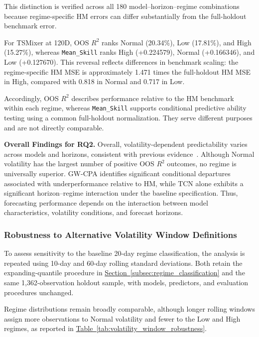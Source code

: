 \documentclass[runningheads,orivec]{llncs}
\begin{document}
This distinction is verified across all 180 model--horizon--regime combinations because regime-specific HM errors can differ substantially from the full-holdout benchmark error.

For TSMixer at 120D, OOS $R^2$ ranks Normal (20.34\%), Low (17.81\%), and High (15.27\%), whereas \texttt{Mean\_Skill} ranks High (+0.224579), Normal (+0.166346), and Low (+0.127670). This reversal reflects differences in benchmark scaling: the regime-specific HM MSE is approximately 1.471 times the full-holdout HM MSE in High, compared with 0.818 in Normal and 0.717 in Low.

Accordingly, OOS $R^2$ describes performance relative to the HM benchmark within each regime, whereas \texttt{Mean\_Skill} supports conditional predictive ability testing using a common full-holdout normalization. They serve different purposes and are not directly comparable.

\medskip
\noindent\textbf{Overall Findings for RQ2.}
Overall, volatility-dependent predictability varies across models and horizons, consistent with previous evidence~\cite{baltas2018,hammerschmid2018,giacomini2010,harvey2021,paye2006}. Although Normal volatility has the largest number of positive OOS $R^2$ outcomes, no regime is universally superior. GW-CPA identifies significant conditional departures associated with underperformance relative to HM, while TCN alone exhibits a significant horizon--regime interaction under the baseline specification. Thus, forecasting performance depends on the interaction between model characteristics, volatility conditions, and forecast horizons.

\subsubsection{Robustness to Alternative Volatility Window Definitions}\label{subsec:volatility_robustness}

To assess sensitivity to the baseline 20-day regime classification, the analysis is repeated using 10-day and 60-day rolling standard deviations. Both retain the expanding-quantile procedure in \hyperref[subsec:regime_classification]{Section~\ref*{subsec:regime_classification}} and the same 1,362-observation holdout sample, with models, predictors, and evaluation procedures unchanged.

Regime distributions remain broadly comparable, although longer rolling windows assign more observations to Normal volatility and fewer to the Low and High regimes, as reported in \hyperref[tab:volatility_window_robustness]{Table~\ref*{tab:volatility_window_robustness}}.
\end{document}
